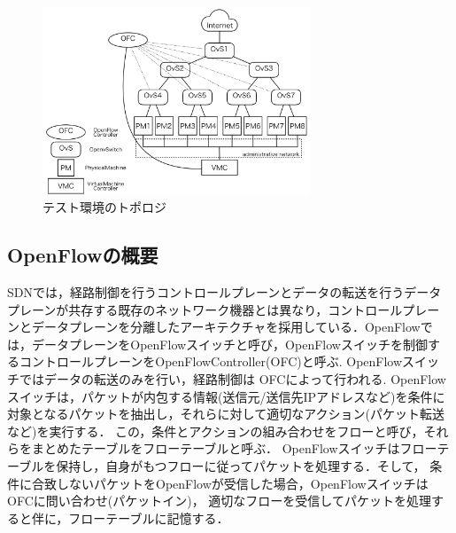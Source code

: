 \documentclass[submit,techrep]{ipsj}
\begin{document}
\begin{figure}[tb]
	\includegraphics[width=8.0cm,bb=0 0 815 574]{fig/topology.png}
	\caption{テスト環境のトポロジ}
	\label{fig:topology}
\end{figure}

\subsection{OpenFlowの概要}
SDNでは，経路制御を行うコントロールプレーンとデータの転送を行うデータ
プレーンが共存する既存のネットワーク機器とは異なり，コントロールプレー
ンとデータプレーンを分離したアーキテクチャを採用している．OpenFlowで
は，データプレーンをOpenFlowスイッチと呼び，OpenFlowスイッチを制御す
るコントロールプレーンをOpenFlowController(OFC)と呼ぶ.  OpenFlowスイッ
チではデータの転送のみを行い，経路制御は OFCによって行われる.
OpenFlowスイッチは，パケットが内包する情報(送信元/送信先IPアドレスなど)を条件に
対象となるパケットを抽出し，それらに対して適切なアクション(パケット転送など)を実行する．
この，条件とアクションの組み合わせをフローと呼び，それらをまとめたテーブルをフローテーブルと呼ぶ．
OpenFlowスイッチはフローテーブルを保持し，自身がもつフローに従ってパケットを処理する．そして，
条件に合致しないパケットをOpenFlowが受信した場合，OpenFlowスイッチはOFCに問い合わせ(パケットイン)，
適切なフローを受信してパケットを処理すると伴に，フローテーブルに記憶する．

\end{document}
